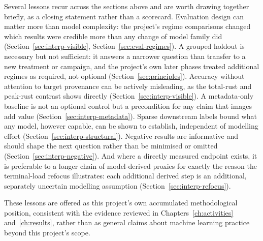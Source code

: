 Several lessons recur across the sections above and are worth drawing
together briefly, as a closing statement rather than a scorecard. Evaluation design can matter more than model complexity: the
project's regime comparisons changed which results were credible more
than any change of model family did (Section~\ref{sec:interp-visible},
Section~\ref{sec:eval-regimes}). A grouped holdout is necessary but not
sufficient: it answers a narrower question than transfer to a new
treatment or campaign, and the project's own later phases treated
additional regimes as required, not optional
(Section~\ref{sec:principles}). Accuracy without attention to target
provenance can be actively misleading, as the total-rust and peak-rust
contrast shows directly (Section~\ref{sec:interp-visible}). A metadata-only
baseline is not an optional control but a precondition for any claim that
images add value (Section~\ref{sec:interp-metadata}). Sparse downstream
labels bound what any model, however capable, can be shown to establish,
independent of modelling effort (Section~\ref{sec:interp-structural}).
Negative results are informative and should shape the next question rather
than be minimised or omitted (Section~\ref{sec:interp-negative}). And
where a directly measured endpoint exists, it is preferable to a longer
chain of model-derived proxies for exactly the reason the terminal-load
refocus illustrates: each additional derived step is an additional,
separately uncertain modelling assumption
(Section~\ref{sec:interp-refocus}).

These lessons are offered as this project's own accumulated methodological
position, consistent with the evidence reviewed in
Chapters~\ref{ch:activities} and~\ref{ch:results}, rather than as general
claims about machine learning practice beyond this project's scope.
